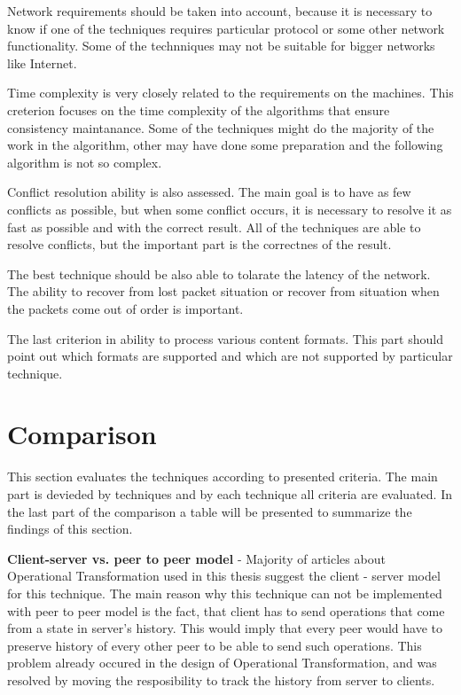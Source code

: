 \documentclass[12pt,oneside]{fithesis2}
\begin{document}
\par Network requirements should be taken into account, because it is necessary to know if one of the techniques requires particular protocol or some other network functionality. Some of the technniques may not be suitable for bigger networks like Internet.
\par Time complexity is very closely related to the requirements on the machines. This creterion focuses on the time complexity of the algorithms that ensure consistency maintanance. Some of the techniques might do the majority of the work in the algorithm, other may have done some preparation and the following algorithm is not so complex.
\par Conflict resolution ability is also assessed. The main goal is to have as few conflicts as possible, but when some conflict occurs, it is necessary to resolve it as fast as possible and with the correct result. All of the techniques are able to resolve conflicts, but the important part is the correctnes of the result. 
\par The best technique should be also able to tolarate the latency of the network. The ability to recover from lost packet situation or recover from situation when the packets come out of order is important. 
\par The last criterion in ability to process various content formats. This part should point out which formats are supported and which are not supported by particular technique.
\section{Comparison}
\par This section evaluates the techniques according to presented criteria. The main part is devieded by techniques and by each technique all criteria are evaluated. In the last part of the comparison a table will be presented to summarize the findings of this section.
\\
\par \textbf{\underline{}}

\vspace{3mm}

\textbf{Client-server vs. peer to peer model} - Majority of articles about Operational Transformation used in this thesis suggest the client - server model for this technique. The main reason why this technique can not be implemented with peer to peer model is the fact, that client has to send operations that come from a state in server's history. This would imply that every peer would have to preserve history of every other peer to be able to send such operations. This problem already occured in the design of Operational Transformation, and was resolved by moving the resposibility to track the history from server to clients.
\end{document}
